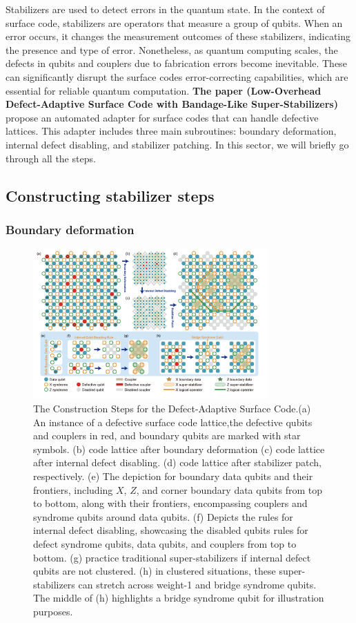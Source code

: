 Stabilizers are used to detect errors in the quantum state. In the context of surface code, stabilizers are operators that measure a group of qubits. When an error occurs, it changes the measurement outcomes of these stabilizers, indicating the presence and type of error. Nonetheless, as quantum computing scales, the defects in qubits and couplers due to fabrication errors become inevitable. These can significantly disrupt the surface codes error-correcting capabilities, which are essential for reliable quantum computation. \textbf{The paper (Low-Overhead Defect-Adaptive Surface Code with Bandage-Like Super-Stabilizers)} propose an automated adapter for surface codes that can handle defective lattices. This adapter includes three main subroutines: boundary deformation, internal defect disabling, and stabilizer patching. In this sector, we will briefly go through all the steps.

\subsection{Constructing stabilizer steps}
\subsubsection{Boundary deformation}

\begin{figure}[ht]
    \centering
    \includegraphics[width=0.8\textwidth]{sections/4_stabilizer/Fig1.png}
    \caption{The Construction Steps for the Defect-Adaptive Surface Code.(a) An instance of a defective surface code lattice,the defective qubits and couplers in red, and boundary qubits are marked with star symbols. (b) code lattice after boundary deformation (c) code lattice after internal defect disabling. (d) code lattice after stabilizer patch, respectively. (e) The depiction for boundary data qubits and their frontiers, including $X$, $Z$, and corner boundary data qubits from top to bottom, along with their frontiers, encompassing couplers and syndrome qubits around data qubits. (f) Depicts the rules for internal defect disabling, showcasing the disabled qubits rules for defect syndrome qubits, data qubits, and couplers from top to bottom. (g) practice traditional super-stabilizers if internal defect qubits are not clustered. (h) in clustered situations, these super-stabilizers can stretch across weight-1 and bridge syndrome qubits. The middle of (h) highlights a bridge syndrome qubit for illustration purposes.}
    \label{fig:Fig1}
\end{figure}

